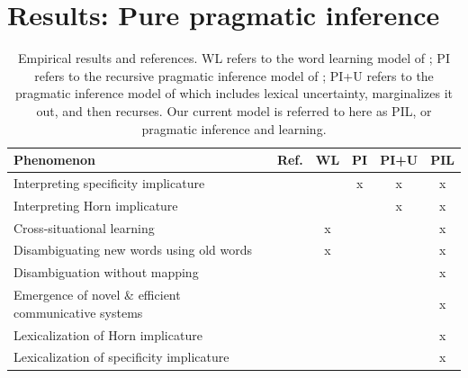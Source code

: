 \documentclass{article} %
\newcommand{\word}{\text{word}}
\newcommand{\obj}{\text{object}}
\newcommand{\lex}{\text{lexicon}}
\begin{document}
%
%
%
%
%

\section{Results: Pure pragmatic inference}


\begin{table}[t]
\label{tab:results}
\begin{center}
\begin{tabular}{lccccc}
\toprule
Phenomenon & Ref. & WL & PI & PI+U & PIL \\
\midrule
Interpreting specificity implicature & \cite{grice1975} &  & x &x & x\\
Interpreting Horn implicature & \cite{horn1984} & &  & x& x\\
Cross-situational learning & \cite{smith2008} & x& & & x \\
Disambiguating new words using old words & \cite{markman1988} &x  & & & x \\
Disambiguation without mapping & \cite{horst2008} &  & & & x \\
Emergence of novel \& efficient communicative systems & \cite{galantucci2005} & & & & x \\
Lexicalization of Horn implicature & \cite{horn1984} & & & & x \\
Lexicalization of specificity implicature & \cite{levinson2000} & & & & x \\
\hline
\end{tabular}
\end{center}
\caption{Empirical results and references. WL refers to the word learning model of \cite{frank2009}; PI refers to the recursive pragmatic inference model of \cite{frank2012}; PI+U refers to the pragmatic inference model of \cite{bergen2012} which includes lexical uncertainty, marginalizes it out, and then recurses. Our current model is referred to here as PIL, or pragmatic inference and learning.}
\end{table}
\end{document}
